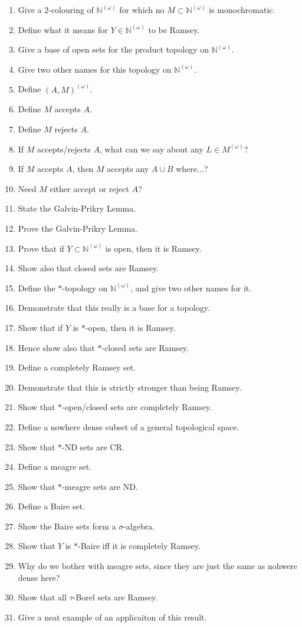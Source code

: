\documentclass[10pt]{article}
\newcommand{\bb}[1]{\mathbb{#1}}
\newcommand{\N}{\bb{N}}
\newcommand{\bom}{{(\omega)}}
\begin{document}
\begin{enumerate}
    \item Give a $2$-colouring of $\N^\bom$ for which no $M\subset \N^\bom$ is monochromatic.
    \item Define what it means for $Y\in\N^\bom$ to be Ramsey.
    \item Give a base of open sets for the product topology on $\N^\bom$.
    \item Give two other names for this topology on $\N^\bom$.
    \item Define $(A,M)^\bom$.
    \item Define $M$ accepts $A$.
    \item Define $M$ rejects $A$.
    \item If $M$ accepts/rejects $A$, what can we say about any $L \in M^\bom$?
    \item If $M$ accepts $A$, then $M$ accepts any $A\cup B$ where...?
    \item Need $M$ either accept or reject $A$?
    \item State the Galvin-Prikry Lemma.
    \item Prove the Galvin-Prikry Lemma.
    \item Prove that if $Y\subset \N^\bom$ is open, then it is Ramsey.
    \item Show also that closed sets are Ramsey.
    \item Define the $\ast$-topology on $\N^\bom$, and give two other names for it.
    \item Demonstrate that this really is a base for a topology.
    \item Show that if $Y$ is $\ast$-open, then it is Ramsey.
    \item Hence show also that $\ast$-closed sets are Ramsey.
    \item Define a completely Ramsey set.
    \item Demonstrate that this is strictly stronger than being Ramsey.
    \item Show that $\ast$-open/closed sets are completely Ramsey.
    \item Define a nowhere dense subset of a general topological space.
    \item Show that $\ast$-ND sets are CR.
    \item Define a meagre set.
    \item Show that $\ast$-meagre sets are ND.
    \item Define a Baire set.
    \item Show the Baire sets form a $\sigma$-algebra.
    \item Show that $Y$ is $\ast$-Baire iff it is completely Ramsey.
    \item Why do we bother with meagre sets, since they are just the same as nohwere dense here?
    \item Show that all $\tau$-Borel sets are Ramsey.
    \item Give a neat example of an applicaiton of this result.
\end{enumerate}
\end{document}
